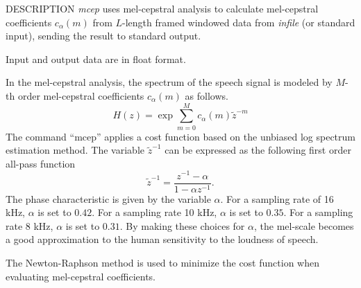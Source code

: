 \begin{synopsis}
\item [mcep] [ --a $A$ ] [ --m $M$ ] [ --l $L$ ] [ --q $Q$ ] [ --i $I$ ] [ --j $J$ ] 
	     [ --d $D$ ] [ --e $E$ ] [ --f $F$ ]
\item [\ ~~~~~~~~] [ {\em infile} ]
\end{synopsis}

\begin{qsection}{DESCRIPTION}
{\em mcep} uses mel-cepstral analysis 
to calculate mel-cepstral coefficients $c_{\alpha}(m)$ 
from $L$-length framed windowed data from {\em infile} (or standard input), 
sending the result to standard output.

Input and output data are in float format.

In the mel-cepstral analysis, the spectrum of the speech signal
is modeled by $M$-th order mel-cepstral coefficients $c_{\alpha}(m)$
as follows.
\begin{displaymath}
H(z) = \exp \sum_{m=0}^M c_{\alpha}(m) \tilde{z}^{-m} 
\end{displaymath}
The command ``mcep'' applies a cost function based on
 the unbiased log spectrum estimation method.
The variable $\tilde{z}^{-1}$ can be expressed as the following
first order all-pass function
\begin{displaymath}
\tilde{z}^{-1} = \frac{z^{-1}-\alpha}{1-\alpha z^{-1}}.
\end{displaymath}
The phase characteristic is given by the variable $\alpha$.
For a sampling rate of 16 kHz, $\alpha$ is set to $0.42$.
For a sampling rate 10 kHz, $\alpha$ is set to $0.35$.
For a sampling rate 8 kHz, $\alpha$ is set to $0.31$.
By making these choices for $\alpha$,
the mel-scale becomes a good approximation to the human
sensitivity to the loudness of speech.

The Newton-Raphson method is used to minimize the cost function
when evaluating mel-cepstral coefficients.
\end{qsection}

